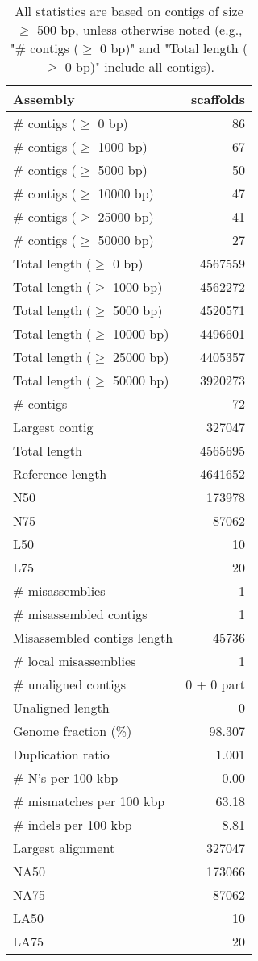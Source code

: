 \documentclass[12pt,a4paper]{article}
\begin{document}
\begin{table}[ht]
\begin{center}
\caption{All statistics are based on contigs of size $\geq$ 500 bp, unless otherwise noted (e.g., "\# contigs ($\geq$ 0 bp)" and "Total length ($\geq$ 0 bp)" include all contigs).}
\begin{tabular}{|l*{1}{|r}|}
\hline
Assembly & scaffolds \\ \hline
\# contigs ($\geq$ 0 bp) & 86 \\ \hline
\# contigs ($\geq$ 1000 bp) & 67 \\ \hline
\# contigs ($\geq$ 5000 bp) & 50 \\ \hline
\# contigs ($\geq$ 10000 bp) & 47 \\ \hline
\# contigs ($\geq$ 25000 bp) & 41 \\ \hline
\# contigs ($\geq$ 50000 bp) & 27 \\ \hline
Total length ($\geq$ 0 bp) & 4567559 \\ \hline
Total length ($\geq$ 1000 bp) & 4562272 \\ \hline
Total length ($\geq$ 5000 bp) & 4520571 \\ \hline
Total length ($\geq$ 10000 bp) & 4496601 \\ \hline
Total length ($\geq$ 25000 bp) & 4405357 \\ \hline
Total length ($\geq$ 50000 bp) & 3920273 \\ \hline
\# contigs & 72 \\ \hline
Largest contig & 327047 \\ \hline
Total length & 4565695 \\ \hline
Reference length & 4641652 \\ \hline
N50 & 173978 \\ \hline
N75 & 87062 \\ \hline
L50 & 10 \\ \hline
L75 & 20 \\ \hline
\# misassemblies & 1 \\ \hline
\# misassembled contigs & 1 \\ \hline
Misassembled contigs length & 45736 \\ \hline
\# local misassemblies & 1 \\ \hline
\# unaligned contigs & 0 + 0 part \\ \hline
Unaligned length & 0 \\ \hline
Genome fraction (\%) & 98.307 \\ \hline
Duplication ratio & 1.001 \\ \hline
\# N's per 100 kbp & 0.00 \\ \hline
\# mismatches per 100 kbp & 63.18 \\ \hline
\# indels per 100 kbp & 8.81 \\ \hline
Largest alignment & 327047 \\ \hline
NA50 & 173066 \\ \hline
NA75 & 87062 \\ \hline
LA50 & 10 \\ \hline
LA75 & 20 \\ \hline
\end{tabular}
\end{center}
\end{table}
\end{document}
